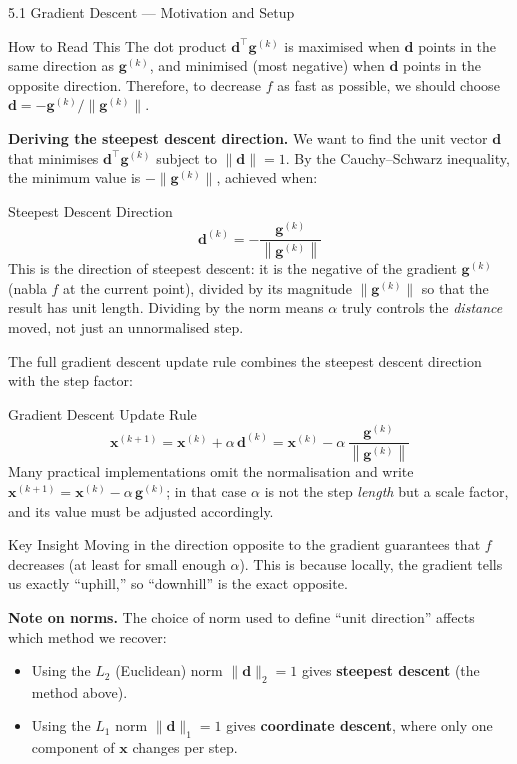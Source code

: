 \documentclass[aspectratio=169,10pt]{beamer}
\newcommand{\vx}{\mathbf{x}}
\newcommand{\vg}{\mathbf{g}}
\newcommand{\vd}{\mathbf{d}}
\newcommand{\norm}[1]{\left\|#1\right\|}
\begin{document}
\begin{frame}[allowframebreaks]{5.1 Gradient Descent --- Motivation and Setup}
  \begin{alertblock}{How to Read This}
    The dot product $\vd^\top\vg^{(k)}$ is maximised when $\vd$
    points in the same direction as $\vg^{(k)}$, and minimised
    (most negative) when $\vd$ points in the opposite direction.
    Therefore, to decrease $f$ as fast as possible, we should
    choose $\vd = -\vg^{(k)}/\|\vg^{(k)}\|$.
  \end{alertblock}

  \framebreak

  \textbf{Deriving the steepest descent direction.}  We want
  to find the unit vector $\vd$ that minimises
  $\vd^\top\vg^{(k)}$ subject to $\|\vd\| = 1$.  By the
  Cauchy--Schwarz inequality, the minimum value is
  $-\|\vg^{(k)}\|$, achieved when:

  \begin{block}{Steepest Descent Direction}
    \[
      \vd^{(k)} = -\frac{\vg^{(k)}}{\norm{\vg^{(k)}}}
    \]
    This is the direction of steepest descent: it is the
    negative of the gradient $\vg^{(k)}$ (nabla $f$ at the
    current point), divided by its magnitude
    $\|\vg^{(k)}\|$ so that the result has unit length.
    Dividing by the norm means $\alpha$ truly controls the
    \emph{distance} moved, not just an unnormalised step.
  \end{block}

  The full gradient descent update rule combines the steepest
  descent direction with the step factor:

  \begin{block}{Gradient Descent Update Rule}
    \[
      \vx^{(k+1)} = \vx^{(k)} + \alpha\,\vd^{(k)}
                  = \vx^{(k)} - \alpha\,\frac{\vg^{(k)}}{\norm{\vg^{(k)}}}
    \]
    Many practical implementations omit the normalisation and
    write $\vx^{(k+1)} = \vx^{(k)} - \alpha\,\vg^{(k)}$; in
    that case $\alpha$ is not the step \emph{length} but a
    scale factor, and its value must be adjusted accordingly.
  \end{block}

  \begin{alertblock}{Key Insight}
    Moving in the direction opposite to the gradient guarantees
    that $f$ decreases (at least for small enough $\alpha$).
    This is because locally, the gradient tells us exactly
    ``uphill,'' so ``downhill'' is the exact opposite.
  \end{alertblock}

  \framebreak

  \textbf{Note on norms.}  The choice of norm used to define
  ``unit direction'' affects which method we recover:
  \begin{itemize}
    \item Using the $L_2$ (Euclidean) norm $\|\vd\|_2 = 1$
          gives \textbf{steepest descent} (the method above).
    \item Using the $L_1$ norm $\|\vd\|_1 = 1$ gives
          \textbf{coordinate descent}, where only one
          component of $\vx$ changes per step.
  \end{itemize}


\end{frame}
\end{document}
